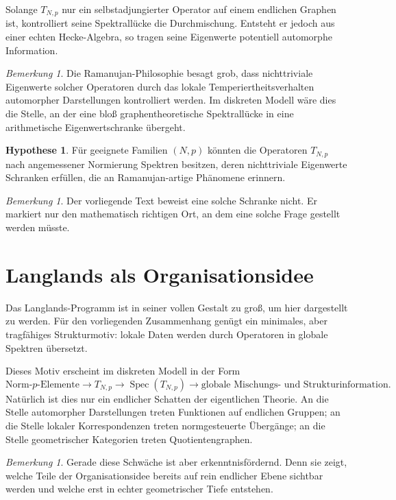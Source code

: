 \documentclass[12pt,a4paper]{article}
\newcommand{\Spec}{\operatorname{Spec}}
\theoremstyle{plain}
\theoremstyle{definition}
\newtheorem{hypothese}[satz]{Hypothese}
\theoremstyle{remark}
\newtheorem{bemerkung}[satz]{Bemerkung}
\begin{document}
	Solange \(T_{N,p}\) nur ein selbstadjungierter Operator auf einem endlichen Graphen ist,
	kontrolliert seine Spektrallücke die Durchmischung.
	Entsteht er jedoch aus einer echten Hecke-Algebra,
	so tragen seine Eigenwerte potentiell automorphe Information.
	
	\begin{bemerkung}
		Die Ramanujan-Philosophie besagt grob,
		dass nichttriviale Eigenwerte solcher Operatoren
		durch das lokale Temperiertheitsverhalten
		automorpher Darstellungen kontrolliert werden.
		Im diskreten Modell wäre dies die Stelle,
		an der eine bloß graphentheoretische Spektrallücke
		in eine arithmetische Eigenwertschranke übergeht.
	\end{bemerkung}
	
	\begin{hypothese}
		Für geeignete Familien \((N,p)\) könnten die Operatoren \(T_{N,p}\)
		nach angemessener Normierung Spektren besitzen,
		deren nichttriviale Eigenwerte Schranken erfüllen,
		die an Ramanujan-artige Phänomene erinnern.
	\end{hypothese}
	
	\begin{bemerkung}
		Der vorliegende Text beweist eine solche Schranke nicht.
		Er markiert nur den mathematisch richtigen Ort,
		an dem eine solche Frage gestellt werden müsste.
	\end{bemerkung}
	
	\section{Langlands als Organisationsidee}
	
	Das Langlands-Programm ist in seiner vollen Gestalt zu groß,
	um hier dargestellt zu werden.
	Für den vorliegenden Zusammenhang genügt ein minimales,
	aber tragfähiges Strukturmotiv:
	lokale Daten werden durch Operatoren in globale Spektren übersetzt.
	
	Dieses Motiv erscheint im diskreten Modell in der Form
	\[
	\text{Norm-}p\text{-Elemente}
	\longrightarrow
	T_{N,p}
	\longrightarrow
	\Spec(T_{N,p})
	\longrightarrow
	\text{globale Mischungs- und Strukturinformation}.
	\]
	Natürlich ist dies nur ein endlicher Schatten der eigentlichen Theorie.
	An die Stelle automorpher Darstellungen treten Funktionen auf endlichen Gruppen;
	an die Stelle lokaler Korrespondenzen treten normgesteuerte Übergänge;
	an die Stelle geometrischer Kategorien treten Quotientengraphen.
	
	\begin{bemerkung}
		Gerade diese Schwäche ist aber erkenntnisfördernd.
		Denn sie zeigt, welche Teile der Organisationsidee bereits auf rein endlicher Ebene
		sichtbar werden und welche erst in echter geometrischer Tiefe entstehen.
	\end{bemerkung}
	
\end{document}
